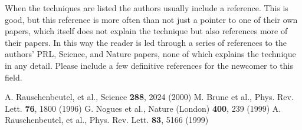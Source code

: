 \documentclass[12pt]{article}
\begin{document}
When the techniques are listed the authors usually include a reference. 
This is good, but this reference is more often than not just a pointer to
one of their own papers, which itself does not explain the technique but also
references more of their papers. In this way the reader is led through a
series of references to the authors' 
PRL, Science, and Nature papers, none of which explains the technique
in any detail. Please include a few definitive references for the 
newcomer to this field.




\begin{thebibliography}{}

 A. Rauschenbeutel, et al., Science {\bf 288}, 2024 (2000)
 M. Brune et al., Phys. Rev. Lett. {\bf 76}, 1800 (1996)
 G. Nogues et al., Nature (London) {\bf 400}, 239 (1999)
 A. Rauschenbeutel, et al., Phys. Rev. Lett. {\bf 83}, 5166 (1999)

\end{thebibliography}
\end{document}
